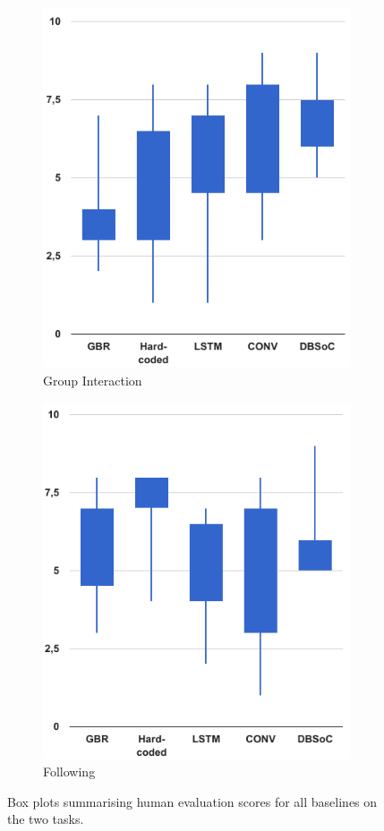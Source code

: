 \documentclass[letterpaper, 10 pt, conference]{ieeeconf}
\begin{document}
	\begin{figure}[tbh]
      \begin{subfigure}[b]{0.40\columnwidth}
    \includegraphics[scale = 0.30]{images/group_candle.png}
    \caption{Group Interaction}
    \label{fig:static-res}
  \end{subfigure}
  \hspace{5mm}
  \begin{subfigure}[b]{0.40\columnwidth}
    \includegraphics[scale = 0.30]{images/follow_candle.png}
    \caption{Following}
    \label{fig:follow}
  \end{subfigure} 
  \caption{Box plots summarising human evaluation scores for all baselines on the two tasks.}
  \label{fig:human}
  \end{figure}
\end{document}
